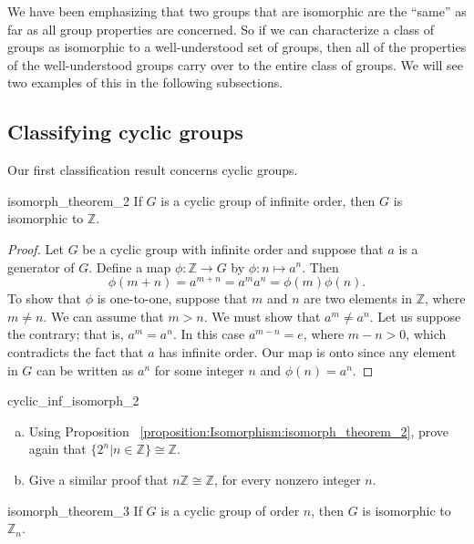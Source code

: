 We have been emphasizing that two groups that are isomorphic are the ``same'' as far as all group properties are concerned. So if we can characterize a class of groups as isomorphic to a well-understood set of groups, then all of the properties of the well-understood groups carry over to the entire class of groups. We will see two examples of this in the following subsections.

\subsection{Classifying cyclic groups}\label{ClassificationOfCylic}

Our first classification result concerns cyclic groups.

\begin{prop}{isomorph_theorem_2}
If $G$ is a  cyclic group of infinite order, then $G$ is isomorphic to ${\mathbb Z}$.
\end{prop}

\begin{proof}
Let $G$ be a cyclic group with infinite order and suppose that $a$ is a generator of $G$.  Define a map $\phi : {\mathbb Z} \rightarrow  G$ by $\phi : n \mapsto a^n$. Then 
\[
\phi( m+n ) = a^{m+n} = a^m a^n = \phi( m ) \phi( n ).
\]
To show that $\phi$ is one-to-one, suppose that $m$ and $n$ are two elements in ${\mathbb Z}$, where $m \neq n$.  We can assume that $m > n$.  We must show that $a^m \neq a^n$. Let us suppose the contrary; that is, $a^m = a^n$. In this case $a^{m - n} = e$, where $m - n>0$, which contradicts the fact that $a$ has infinite order.  Our map is onto since any element in $G$ can be written as $a^n$ for some integer $n$ and $\phi(n) = a^n$.   
\end{proof}

\begin{exercise}{cyclic_inf_isomorph_2}
\begin{enumerate}[(a)]
\item
Using Proposition ~\ref{proposition:Isomorphism:isomorph_theorem_2}, prove again that $\{2^n | n \in {\mathbb Z} \} \cong {\mathbb Z}$.
\item
Give a similar proof that $n{\mathbb Z} \cong {\mathbb Z}$, for every nonzero integer $n$.
\end{enumerate}
\end{exercise}


\begin{prop}{isomorph_theorem_3}
If $G$ is a cyclic group of order $n$, then $G$ is isomorphic to~${\mathbb Z}_n$.  
\end{prop}
 

